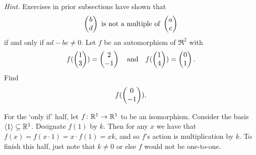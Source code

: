 \begin{exercises}
\begin{exparts}
        \textit{Hint.}
        Exercises in prior subsections have shown that 
        \begin{equation*}
          \colvec{b \\ d}\text{\ is not a multiple of\ }\colvec{a \\ c}
        \end{equation*}
        if and only if $ad-bc\neq 0$.
      \partsitem Let \( f \) be an automorphism of \( \Re^2 \) with
        \begin{equation*}
          f(\begin{pmatrix} 1 \\ 3 \end{pmatrix})=\begin{pmatrix} 2 \\ -1 \end{pmatrix}
           \quad\text{and}\quad
          f(\begin{pmatrix} 1 \\ 4 \end{pmatrix})=\begin{pmatrix} 0 \\ 1 \end{pmatrix}.
        \end{equation*}
        Find
        \begin{equation*}
          f(\begin{pmatrix} 0 \\ -1 \end{pmatrix}).
        \end{equation*}
    \end{exparts}
    \begin{answer}
      \begin{exparts}
        \partsitem For the `only if' half, let \( \mbox{$f\colon \mathbb{R}^1\to \mathbb{R}^1$} \) 
          to be an isomorphism. 
          Consider the basis \( \langle1\rangle\subseteq\mathbb{R}^1 \).
          Designate \( f(1) \) by \( k \).
          Then for any \( x \) we have that
          \( f(x)=f(x\cdot 1)=x\cdot f(1)=xk \), and so $f$'s action is
          multiplication by $k$.
          To finish this half, just note that
          \( k\neq 0 \) or else $f$ would not be one-to-one.


\end{exparts}
\end{answer}
\end{exercises}
